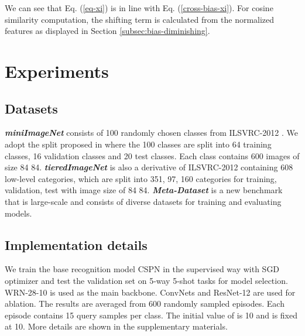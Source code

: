 \documentclass[runningheads]{llncs}
\begin{document}
We can see that Eq. (\ref{eq-xi}) is in line with Eq. (\ref{cross-bias-xi}). For cosine similarity computation, the shifting term is calculated from the normalized features as displayed in Section \ref{subsec:bias-diminishing}.


\section{Experiments}
\label{sec:experiment}
\subsection{Datasets}
\textbf{\textit{miniImageNet}} consists of 100 randomly chosen classes from ILSVRC-2012 \cite{russakovsky2015imagenet}. We adopt the split proposed in \cite{ravi2017optimization} where the 100 classes are split into 64 training classes, 16 validation classes and 20 test classes. Each class contains 600 images of size 84  84.
\textbf{\textit{tieredImageNet}} \cite{ren2018meta} is also a derivative of ILSVRC-2012 \cite{russakovsky2015imagenet} containing 608 low-level categories, which are split into 351, 97, 160 categories for training, validation, test with image size of 84  84.
\textbf{\textit{Meta-Dataset}} \cite{triantafillou2020meta} is a new benchmark that is large-scale and consists of diverse datasets for training and evaluating models.

\subsection{Implementation details}
We train the base recognition model CSPN in the supervised way with SGD optimizer and test the validation set on 5-way 5-shot tasks for model selection. WRN-28-10 \cite{zagoruyko2016wide} is used as the main backbone. ConvNets \cite{gidaris2018dynamic} and ResNet-12 \cite{lee2019meta} are used for ablation. The results are averaged from 600 randomly sampled episodes. Each episode contains 15 query samples per class. The initial value of  is 10 and  is fixed at 10. More details are shown in the supplementary materials.
\end{document}
